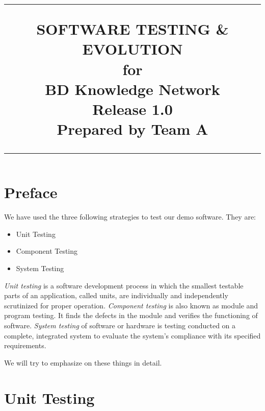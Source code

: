 \documentclass{scrreprt}
\title{%
\flushright
\rule{16cm}{5pt}\vskip1cm
\Huge{SOFTWARE TESTING \& EVOLUTION}\\
\vspace{2cm}
for\\
\vspace{2cm}
BD Knowledge Network\\
\vspace{2cm}
\LARGE{Release 1.0\\}
\vspace{4cm}
Prepared by Team A\\
\vfill
\rule{16cm}{5pt}
}
\date{}
\begin{document}
\cfoot{\thepage}
\maketitle
\tableofcontents
\chapter*{Preface}
We have used the three following strategies to test our demo software. They are: 
\begin{itemize}
\item Unit Testing
\item Component Testing
\item System Testing
\end{itemize}

\emph{Unit testing} is a software development process in which the smallest testable parts of an application, called units, are individually and independently scrutinized for proper operation. \emph{Component testing} is also known as module and program testing. It finds the defects in the module and verifies the functioning of software. \emph{System testing} of software or hardware is testing conducted on a complete, integrated system to evaluate the system's compliance with its specified requirements.

We will try to emphasize on these things in detail.
\chapter{Unit Testing}
\end{document}
